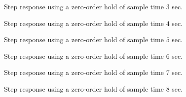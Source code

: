 \begin{figure}[H]\centering
	\centering
	\scalebox{1}{}
  \caption{Step response using a zero-order hold of sample time $3$ sec.}
  \label{fig:Q7.3}
\end{figure}

\begin{figure}[H]\centering
	\centering
	\scalebox{1}{}
  \caption{Step response using a zero-order hold of sample time $4$ sec.}
  \label{fig:Q7.4}
\end{figure}

\begin{figure}[H]\centering
	\centering
	\scalebox{1}{}
  \caption{Step response using a zero-order hold of sample time $5$ sec.}
  \label{fig:Q7.5}
\end{figure}

\begin{figure}[H]\centering
	\centering
	\scalebox{1}{}
  \caption{Step response using a zero-order hold of sample time $6$ sec.}
  \label{fig:Q7.6}
\end{figure}

\begin{figure}[H]\centering
	\centering
	\scalebox{1}{}
  \caption{Step response using a zero-order hold of sample time $7$ sec.}
  \label{fig:Q7.7}
\end{figure}

\begin{figure}[H]\centering
	\centering
	\scalebox{1}{}
  \caption{Step response using a zero-order hold of sample time $8$ sec.}
  \label{fig:Q7.8}
\end{figure}
